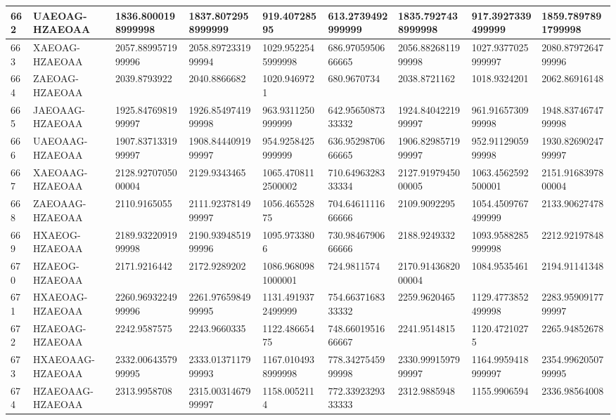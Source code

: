 {\begin{longtable}{|l|l|l|l|l|l|l|l|l|}
        662 & UAEOAG-HZAEOAA & 1836.8000198999998 & 1837.8072958999999 & 919.40728595 & 613.2739492999999 & 1835.7927438999998 & 917.3927339499999 & 1859.7897891799998 \\ \hline
        663 & XAEOAG-HZAEOAA & 2057.8899571999996 & 2058.8972331999994 & 1029.9522545999998 & 686.9705950666665 & 2056.8826811999998 & 1027.9377025999997 & 2080.8797264799996 \\ \hline
        664 & ZAEOAG-HZAEOAA & 2039.8793922 & 2040.8866682 & 1020.9469721 & 680.9670734 & 2038.8721162 & 1018.9324201 & 2062.86916148 \\ \hline
        665 & JAEOAAG-HZAEOAA & 1925.8476981999997 & 1926.8549741999998 & 963.9311250999999 & 642.9565087333332 & 1924.8404221999997 & 961.9165730999998 & 1948.8374674799998 \\ \hline
        666 & UAEOAAG-HZAEOAA & 1907.8371331999997 & 1908.8444091999997 & 954.9258425999999 & 636.9529870666665 & 1906.8298571999997 & 952.9112905999998 & 1930.8269024799997 \\ \hline
        667 & XAEOAAG-HZAEOAA & 2128.9270705000004 & 2129.9343465 & 1065.4708112500002 & 710.6496328333334 & 2127.9197945000005 & 1063.4562592500001 & 2151.9168397800004 \\ \hline
        668 & ZAEOAAG-HZAEOAA & 2110.9165055 & 2111.9237814999997 & 1056.46552875 & 704.6461111666666 & 2109.9092295 & 1054.4509767499999 & 2133.90627478 \\ \hline
        669 & HXAEOG-HZAEOAA & 2189.9322091999998 & 2190.9394851999996 & 1095.9733806 & 730.9846790666666 & 2188.9249332 & 1093.9588285999998 & 2212.92197848 \\ \hline
        670 & HZAEOG-HZAEOAA & 2171.9216442 & 2172.9289202 & 1086.9680981000001 & 724.9811574 & 2170.9143682000004 & 1084.9535461 & 2194.91141348 \\ \hline
        671 & HXAEOAG-HZAEOAA & 2260.9693224999996 & 2261.9765984999995 & 1131.4919372499999 & 754.6637168333332 & 2259.9620465 & 1129.4773852499998 & 2283.9590917799997 \\ \hline
        672 & HZAEOAG-HZAEOAA & 2242.9587575 & 2243.9660335 & 1122.48665475 & 748.6601951666667 & 2241.9514815 & 1120.47210275 & 2265.94852678 \\ \hline
        673 & HXAEOAAG-HZAEOAA & 2332.0064357999995 & 2333.0137117999993 & 1167.0104938999998 & 778.3427545999998 & 2330.9991597999997 & 1164.9959418999997 & 2354.9962050799995 \\ \hline
        674 & HZAEOAAG-HZAEOAA & 2313.9958708 & 2315.0031467999997 & 1158.0052114 & 772.3392329333333 & 2312.9885948 & 1155.9906594 & 2336.98564008 \\ \hline

\end{longtable}}
